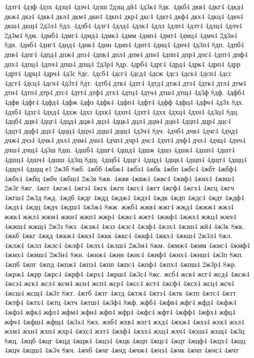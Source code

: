 {4дзт4
4дзф
4дзх
4дзц4
4дзч4
4дзш
2дзщ
дй4
4д3к4
8дк.
4дкб4
дкв4
4дкг4
4дкд4
дкж4
дкз4
4дкк4
дкл4
дкм4
дкн4
4дкп4
дкр4
дкс4
4дкт4
дкф4
дкх4
4дкц4
4дкч4
дкш4
дкщ4
2д3л4
8дл.
4длб4
4длг4
4длд4
4длк4
4длл
4длп4
4длт4
4длц4
4длч4
2д3м4
8дм.
4дмб4
4дмг4
4дмд4
4дмк4
4дмм
4дмп4
4дмт4
4дмц4
4дмч4
2д3н4
8дн.
4днб4
4днг4
4днд4
4днк4
4днн
4днп4
4днт4
4днц4
4днч4
4д3п4
8дп.
4дпб4
дпв4
4дпг4
4дпд4
дпж4
дпз4
4дпк4
дпл4
дпм4
дпн4
4дпп4
дпр4
дпс4
4дпт4
дпф4
дпх4
4дпц4
4дпч4
дпш4
дпщ4
2д3р4
8др.
4дрб4
4дрг4
4дрд4
4дрк4
4дрп4
4дрр
4дрт4
4дрц4
4дрч4
4д3с
8дс.
4дсб4
4дсг4
4дсд4
4дсж
4дсз
4дск4
4дсп4
4дсс
4дст4
4дсц4
4дсч4
4д3т4
8дт.
4дтб4
дтв4
4дтг4
4дтд4
дтж4
дтз4
4дтк4
дтл4
дтм4
дтн4
4дтп4
дтр4
дтс4
4дтт4
дтф4
дтх4
4дтц4
4дтч4
дтш4
дтщ4
4д3ф
8дф.
4дфб4
4дфв
4дфг4
4дфд4
4дфж
4дфз
4дфк4
4дфп4
4дфт4
4дфф
4дфц4
4дфч4
4д3х
8дх.
4дхб4
4дхг4
4дхд4
4дхж
4дхз
4дхк4
4дхп4
4дхт4
4дхх
4дхц4
4дхч4
4д3ц4
8дц.
4дцб4
дцв4
4дцг4
4дцд4
дцж4
дцз4
4дцк4
дцл4
дцм4
дцн4
4дцп4
дцр4
дцс4
4дцт4
дцф4
дцх4
4дцц4
4дцч4
дцш4
дцщ4
4д3ч4
8дч.
4дчб4
дчв4
4дчг4
4дчд4
дчж4
дчз4
4дчк4
дчл4
дчм4
дчн4
4дчп4
дчр4
дчс4
4дчт4
дчф4
дчх4
4дчц4
4дчч4
дчш4
дчщ4
4д3ш
8дш.
4дшб4
4дшг4
4дшд4
4дшж
4дшз
4дшк4
4дшп4
4дшт4
4дшц4
4дшч4
4дшш
4д3щ
8дщ.
4дщб4
4дщг4
4дщд4
4дщк4
4дщп4
4дщт4
4дщц4
4дщч4
4дщщ
е1
2ж3б
8жб.
4жбб
4жбж4
4жбз4
4жбк
4жбп
4жбс4
4жбт
4жбф4
4жбх4
4жбц
4жбч
4жбш4
2ж3в
8жв.
4жвв
4жвж4
4жвс4
4жвф4
4жвх4
4жвш4
2ж3г
8жг.
4жгг
4жгж4
4жгз4
4жгк
4жгп
4жгс4
4жгт
4жгф4
4жгх4
4жгц
4жгч
4жгш4
2ж3д
8жд.
4ждб
4ждг
4ждд
4ждж4
4ждз4
4ждк
4ждп
4ждс4
4ждт
4ждф4
4ждх4
4ждц
4ждч
4ждш4
4ж3ж4
8жж.
жжб4
жжв4
жжг4
жжд4
4жжж4
жжз4
жжк4
жжл4
жжм4
жжн4
жжп4
жжр4
4жжс4
жжт4
4жжф4
4жжх4
жжц4
жжч4
4жжш4
жжщ4
2ж3з
8жз.
4жзж4
4жзз
4жзс4
4жзф4
4жзх4
4жзш4
жй4
4ж3к
8жк.
4жкб
4жкг
4жкд
4жкж4
4жкз4
4жкк
4жкс4
4жкф4
4жкх4
4жкш4
2ж3л4
8жл.
4жлж4
4жлл
4жлс4
4жлф4
4жлх4
4жлш4
2ж3м4
8жм.
4жмж4
4жмм
4жмс4
4жмф4
4жмх4
4жмш4
2ж3н4
8жн.
4жнж4
4жнн
4жнс4
4жнф4
4жнх4
4жнш4
4ж3п
8жп.
4жпб
4жпг
4жпд
4жпж4
4жпз4
4жпп
4жпс4
4жпф4
4жпх4
4жпш4
2ж3р4
8жр.
4жрж4
4жрр
4жрс4
4жрф4
4жрх4
4жрш4
4ж3с4
8жс.
жсб4
жсв4
жсг4
жсд4
4жсж4
4жсз4
жск4
жсл4
жсм4
жсн4
жсп4
жср4
4жсс4
жст4
4жсф4
4жсх4
жсц4
жсч4
4жсш4
жсщ4
4ж3т
8жт.
4жтб
4жтг
4жтд
4жтж4
4жтз4
4жтк
4жтп
4жтс4
4жтт
4жтф4
4жтх4
4жтц
4жтч
4жтш4
4ж3ф4
8жф.
жфб4
4жфв4
жфг4
жфд4
4жфж4
4жфз4
жфк4
жфл4
жфм4
жфн4
жфп4
жфр4
4жфс4
жфт4
4жфф4
4жфх4
жфц4
жфч4
4жфш4
жфщ4
4ж3х4
8жх.
жхб4
жхв4
жхг4
жхд4
4жхж4
4жхз4
жхк4
жхл4
жхм4
жхн4
жхп4
жхр4
4жхс4
жхт4
4жхф4
4жхх4
жхц4
жхч4
4жхш4
жхщ4
4ж3ц
8жц.
4жцб
4жцг
4жцд
4жцж4
4жцз4
4жцк
4жцп
4жцс4
4жцт
4жцф4
4жцх4
4жцц
4жцч
4жцш4
4ж3ч
8жч.
4жчб
4жчг
4жчд
4жчж4
4жчз4
4жчк
4жчп
4жчс4
4жчт
}
